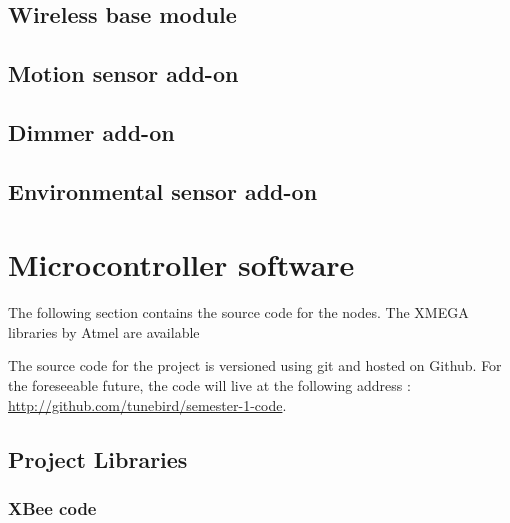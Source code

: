 \subsection{Wireless base module}


\subsection{Motion sensor add-on}


\subsection{Dimmer add-on}


\subsection{Environmental sensor add-on}


\pagebreak
\section{Microcontroller software}
The following section contains the source code for the nodes. The XMEGA
libraries by Atmel are available %

The source code for the project is versioned using git and hosted on
Github. For the foreseeable future, the code will live
at the following address : \url{http://github.com/tunebird/semester-1-code}.


\subsection{Project Libraries}
\label{an:project-libs}

\subsubsection{XBee code}



